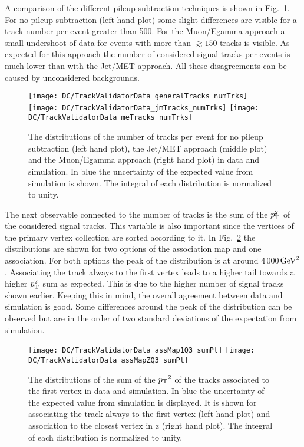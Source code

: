 A comparison of the different pileup subtraction techniques is shown in Fig.~\ref{plot:DCTVTDPUS}. For no pileup subtraction (left hand plot) some slight differences are visible for a track number per event greater than 500. For the Muon/Egamma approach a small undershoot of data for events with more than $\gtrsim150$ tracks is visible. As expected for this approach the number of considered signal tracks per events is much lower than with the Jet/MET approach. All these disagreements can be caused by unconsidered backgrounds.

\begin{figure}[Ht]
  \centering
  \texttt{[image: DC/TrackValidatorData\_generalTracks\_numTrks]}
  \texttt{[image: DC/TrackValidatorData\_jmTracks\_numTrks]}
  \texttt{[image: DC/TrackValidatorData\_meTracks\_numTrks]}
  \caption[Track number in data and simulation of the different pileup subtraction techniques]{The distributions of the number of tracks per event for no pileup subtraction (left hand plot), the Jet/MET approach (middle plot) and the Muon/Egamma approach (right hand plot) in data and simulation. In blue the uncertainty of the expected value from simulation is shown. The integral of each distribution is normalized to unity. \label{plot:DCTVTDPUS}}
\end{figure}

The next observable connected to the number of tracks is the sum of the $p_{\mathrm{T}}^{2}$ of the considered signal tracks. This variable is also important since the vertices of the primary vertex collection are sorted according to it. In Fig.~\ref{plot:DCTVSumPt} the distributions are shown for two options of the association map and one association. For both options the peak of the distribution is at around 4\,000$\,\text{Ge\hspace{-.08em}V}^{2}$. Associating the track always to the first vertex leads to a higher tail towards a higher $p_{\mathrm{T}}^{2}$ sum as expected. This is due to the higher number of signal tracks shown earlier. Keeping this in mind, the overall agreement between data and simulation is good. Some differences around the peak of the distribution can be observed but are in the order of two standard deviations of the expectation from simulation.

\begin{figure}[Ht]
  \centering
  \texttt{[image: DC/TrackValidatorData\_assMap1Q3\_sumPt]}
  \texttt{[image: DC/TrackValidatorData\_assMapZQ3\_sumPt]}
  \caption[Distribution of the first vertex $\pt{}^{2}$ in data and simulation of two options of the association map]{The distributions of the sum of the $\pt{}^{2}$ of the tracks associated to the first vertex in data and simulation. In blue the uncertainty of the expected value from simulation is displayed. It is shown for associating the track always to the first vertex (left hand plot) and association to the closest vertex in z (right hand plot). The integral of each distribution is normalized to unity. \label{plot:DCTVSumPt}}
\end{figure}

